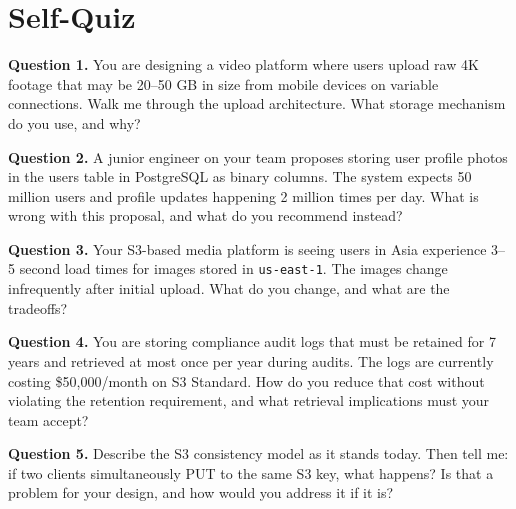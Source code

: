 \documentclass[11pt,a4paper]{article}
\begin{document}
\section{Self-Quiz}

\newpage

\begin{quizbox}

\textbf{Question 1.} You are designing a video platform where users upload raw 4K footage that may be 20--50 GB in size from mobile devices on variable connections. Walk me through the upload architecture. What storage mechanism do you use, and why?

\medskip
\textbf{Question 2.} A junior engineer on your team proposes storing user profile photos in the users table in PostgreSQL as binary columns. The system expects 50 million users and profile updates happening 2 million times per day. What is wrong with this proposal, and what do you recommend instead?

\medskip
\textbf{Question 3.} Your S3-based media platform is seeing users in Asia experience 3--5 second load times for images stored in \texttt{us-east-1}. The images change infrequently after initial upload. What do you change, and what are the tradeoffs?

\medskip
\textbf{Question 4.} You are storing compliance audit logs that must be retained for 7 years and retrieved at most once per year during audits. The logs are currently costing \$50,000/month on S3 Standard. How do you reduce that cost without violating the retention requirement, and what retrieval implications must your team accept?

\medskip
\textbf{Question 5.} Describe the S3 consistency model as it stands today. Then tell me: if two clients simultaneously PUT to the same S3 key, what happens? Is that a problem for your design, and how would you address it if it is?

\end{quizbox}

\newpage
\end{document}
